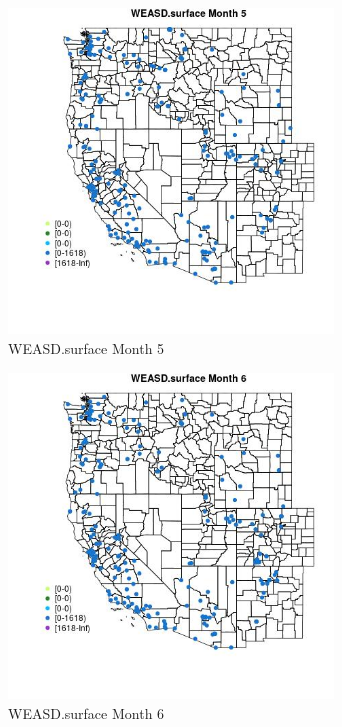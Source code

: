 \begin{figure} 
\centering  
\includegraphics[width=0.77\textwidth]{Code_Outputs/Report_ML_input_PM25_Step4_part_e_de_duplicated_aveswNAs_MapObsMo5WEASDsurface.jpg} 
\caption{\label{fig:Report_ML_input_PM25_Step4_part_e_de_duplicated_aveswNAsMapObsMo5WEASDsurface}WEASD.surface Month 5} 
\end{figure} 
 

\begin{figure} 
\centering  
\includegraphics[width=0.77\textwidth]{Code_Outputs/Report_ML_input_PM25_Step4_part_e_de_duplicated_aveswNAs_MapObsMo6WEASDsurface.jpg} 
\caption{\label{fig:Report_ML_input_PM25_Step4_part_e_de_duplicated_aveswNAsMapObsMo6WEASDsurface}WEASD.surface Month 6} 
\end{figure} 
 


